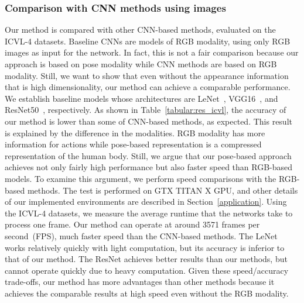 \documentclass[10pt,twocolumn,letterpaper]{article}
\begin{document}
\subsubsection{Comparison with CNN methods using images}
\quad Our method is compared with other CNN-based methods, evaluated on the ICVL-4 datasets.
Baseline CNNs are models of RGB modality, using only RGB images as input for the network.
In fact, this is not a fair comparison because our approach is based on pose modality while CNN methods are based on RGB modality.
Still, we want to show that even without the appearance information that is high dimensionality, our method can achieve a comparable performance.
We establish baseline models whose architectures are LeNet~\cite{lecun1998gradient}, VGG16~\cite{simonyan2014very}, and ResNet50~\cite{he2016deep}, respectively.
As shown in Table~\ref{tabular:res_icvl}, the accuracy of our method is lower than some of CNN-based methods, as expected. 
This result is explained by the difference in the modalities.
RGB modality has more information for actions while pose-based representation is a compressed representation of the human body. 
Still, we argue that our pose-based approach achieves not only fairly high performance but also faster speed than RGB-based models.
To examine this argument, we perform speed comparisons with the RGB-based methods.
The test is performed on GTX TITAN X GPU, and other details of our implemented environments are described in Section~\ref{application}.
Using the ICVL-4 datasets, we measure the average runtime that the networks take to process one frame.
Our method can operate at around 3571 frames per second~(FPS), much faster speed than the CNN-based methods.
The LeNet works relatively quickly with light computation, but its accuracy is inferior to that of our method.
The ResNet achieves better results than our methods, but cannot operate quickly due to heavy computation.
Given these speed/accuracy trade-offs, our method has more advantages than other methods because it achieves the comparable results at high speed even without the RGB modality.
\end{document}
